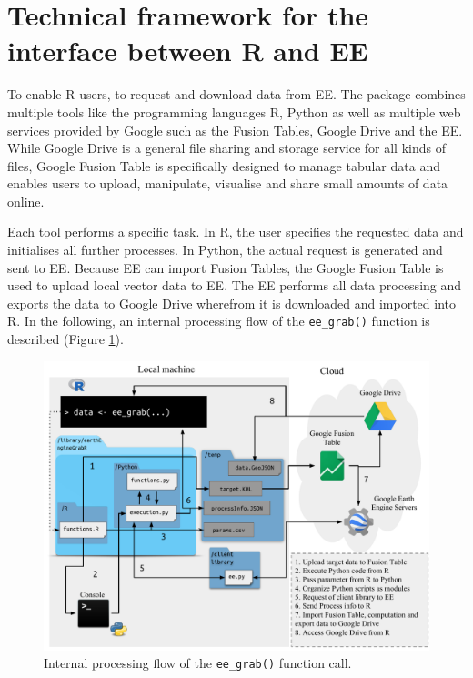 \section{Technical framework for the interface between R and EE}

To enable R users, to request and download data from EE. The package combines multiple tools like the programming languages R, Python as well as multiple web services provided by Google such as the Fusion Tables, Google Drive and the EE. While Google Drive is a general file sharing and storage service for all kinds of files, Google Fusion Table is specifically designed to manage tabular data and enables users to upload, manipulate, visualise and share small amounts of data online.

Each tool performs a specific task. In R, the user specifies the requested data and initialises all further processes. In Python, the actual request is generated and sent to EE. Because EE can import Fusion Tables, the Google Fusion Table is used to upload local vector data to EE. The EE performs all data processing and exports the data to Google Drive wherefrom it is downloaded and imported into R. 
In the following, an internal processing flow of the \texttt{ee\_grab()} function is described (Figure \ref{processingFlow}).
\begin{center}
	\begin{figure}[h]
		\begin{center}
			\includegraphics[width=15cm]{images/processing_flow_big.pdf}
			\caption{Internal processing flow of the \texttt{ee\_grab()} function call.}
			\label{processingFlow}
		\end{center}
	\end{figure}
\end{center}


